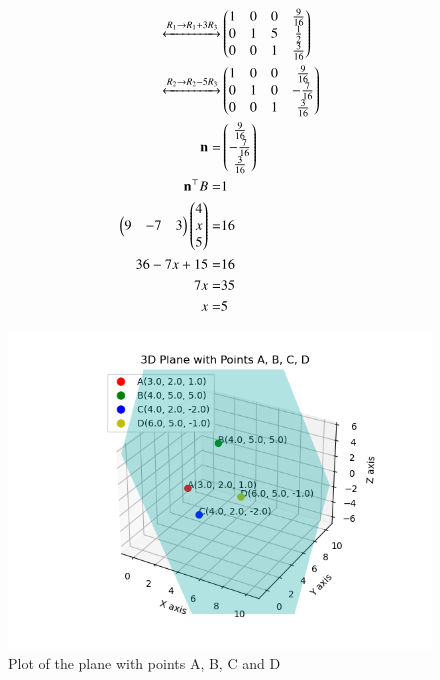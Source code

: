 \documentclass[journal]{IEEEtran}
\begin{document}
\begin{align}
    \xleftrightarrow[]{R_1 \to R_1+3R_3}&\begin{pmatrix}1 & 0 & 0 & \frac{9}{16} \\ 0 & 1 & 5 & \frac{1}{2} \\ 0 & 0 & 1 & \frac{3}{16}\end{pmatrix} \\
    \xleftrightarrow[]{R_2 \to R_2-5R_3}&\begin{pmatrix}1 & 0 & 0 & \frac{9}{16} \\ 0 & 1 & 0 & -\frac{7}{16} \\ 0 & 0 & 1 & \frac{3}{16}\end{pmatrix} \\
    \mathbf{n}=&\begin{pmatrix}\frac{9}{16} \\ -\frac{7}{16} \\ \frac{3}{16}\end{pmatrix} \\
    \mathbf{n}^{\top}B=&1 \\
    \begin{pmatrix}9 & -7 & 3\end{pmatrix}\begin{pmatrix}4 \\ x \\ 5\end{pmatrix}=&16 \\
    36-7x+15=&16 \\
    7x=&35 \\
    x=&5
\end{align}
\begin{figure}[ht!]
	\centering
   	\includegraphics[width=\linewidth]{figs/fig.png}
   	\caption{Plot of the plane with points A, B, C and D}
\label{Plot}
\end{figure}
\end{document}
